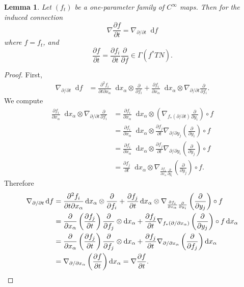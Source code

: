 \documentclass[reqno,12pt,letterpaper]{amsart}
\newcommand*\dif{\mathop{}\!\mathrm{d}}
\newcommand{\parl}{\left(}
\newcommand{\parr}{\right)}
\newtheorem{lemma}[theorem]{Lemma}
\theoremstyle{definition}
\numberwithin{equation}{section}
\begin{document}
\begin{lemma}
Let $(f_t)$ be a one-parameter family of $C^\infty$ maps.
Then for the induced connection 
$$\nabla \frac{\partial f}{\partial t} = \nabla_{\partial/\partial t} \dif f$$
where $f = f_t$, and 
$$\frac{\partial f}{\partial t} = \frac{\partial f_i}{\partial t} \frac{\partial}{\partial f} \in \Gamma(f^* TN).$$
\end{lemma}
\begin{proof}
First,
\begin{align*}
\nabla_{\partial/\partial t} \dif f &= \frac{\partial^2 f_i}{\partial t \partial x_\alpha} \dif x_\alpha \otimes \frac{\partial}{\partial f_i} + \frac{\partial f_i}{\partial x_\alpha} \dif x_\alpha \otimes \nabla_{\partial/\partial t} \frac{\partial}{\partial f_i}.
\end{align*}
We compute 
\begin{align*}
    \frac{\partial f_i}{\partial x_\alpha} \dif x_\alpha \otimes \nabla_{\partial/\partial t} \frac{\partial}{\partial f_i} &= \frac{\partial f_i}{\partial x_\alpha} \dif x_\alpha \otimes \parl \nabla_{f_*(\partial/\partial t)} \frac{\partial}{\partial y_i} \parr \circ f \\
    &= \frac{\partial f_i}{\partial x_\alpha} \dif x_\alpha \otimes \frac{\partial f_j}{\partial t} \nabla_{\partial/\partial y_j} \parl \frac{\partial}{\partial y_i} \parr \circ f \\
    &= \frac{\partial f_i}{\partial x_\alpha} \dif x_\alpha \otimes \frac{\partial f_j}{\partial t} \nabla_{\partial/\partial y_i} \parl \frac{\partial}{\partial y_j} \parr \circ f \\
    &= \frac{\partial f_j}{\partial t} \dif x_\alpha \otimes \nabla_{\frac{\partial f_i}{\partial x_\alpha} \frac{\partial}{\partial y_i}} \parl \frac{\partial}{\partial y_j} \parr \circ f.
\end{align*}
Therefore 
\begin{align*}
\nabla_{\partial/\partial t} \dif f &= \frac{\partial^2 f_i}{\partial t \partial x_\alpha} \dif x_\alpha \otimes \frac{\partial}{\partial f_i} + \frac{\partial f_j}{\partial t} \dif x_\alpha \otimes \nabla_{\frac{\partial f_i}{\partial x_\alpha} \frac{\partial}{\partial y_i}} \parl \frac{\partial}{\partial y_j} \parr \circ f \\
&= \frac{\partial}{\partial x_\alpha} \parl \frac{\partial f_j}{\partial t} \parr \frac{\partial}{\partial f_j} \otimes \dif x_\alpha + \frac{\partial f_j}{\partial t} \nabla_{f_*(\partial/\partial x_\alpha)} \parl \frac{\partial}{\partial y_j} \parr \circ f \dif x_\alpha \\
&= \frac{\partial}{\partial x_\alpha} \parl \frac{\partial f_j}{\partial t} \parr \frac{\partial}{\partial f_j} \otimes \dif x_\alpha + \frac{\partial f_j}{\partial t} \nabla_{\partial/\partial x_\alpha} \parl \frac{\partial}{\partial f_j} \parr \dif x_\alpha \\
&= \nabla_{\partial/\partial x_\alpha} \parl \frac{\partial f}{\partial t} \parr \dif x_\alpha = \nabla \frac{\partial f}{\partial t}. \qedhere
\end{align*}
\end{proof}
\end{document}
